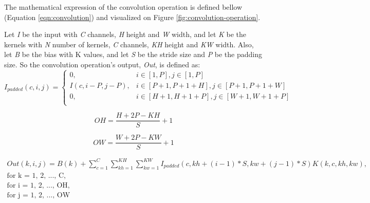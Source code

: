 The mathematical expression of the convolution operation is defined bellow (Equation \ref{eqn:convolution}) and visualized on Figure \ref{fig:convolution-operation}.

Let \emph{I} be the input with \emph{C} channels, \emph{H} height and \emph{W} width, and let \emph{K} be the kernels with \emph{N} number of kernels, \emph{C} channels, \emph{KH} height and \emph{KW} width. Also, let \emph{B} be the bias with K values, and let \emph{S} be the stride size and \emph{P} be the padding size. So the convolution operation's output, \emph{Out}, is defined as:
\begin{equation}
	I_{padded}(c, i, j) = \begin{cases}
		0,                  & i \in [1, P], j \in [1, P]                         \\
		I(c, i - P, j - P), & i \in [P + 1, P + 1 + H], j \in [P + 1, P + 1 + W] \\
		0,                  & i \in [H + 1, H + 1 + P], j \in [W + 1, W + 1 + P] \\
	\end{cases}
\end{equation}

\begin{equation}
	OH = \frac{H + 2P - KH}{S} + 1
\end{equation}

\begin{equation}
	OW = \frac{W + 2P - KW}{S} + 1
\end{equation}

\begin{equation}
	\label{eqn:convolution}
	\begin{split}
		Out(k, i, j) = B(k) +
		\sum_{c = 1}^{C} \sum_{kh = 1}^{KH} \sum_{kw = 1}^{KW}
		I_{padded}(c, kh + (i - 1) * S, kw + (j - 1) * S) K(k, c, kh, kw),\\
		\mbox{for k = 1, 2, ..., C},\\
		\mbox{for i = 1, 2, ..., OH},\\
		\mbox{for j = 1, 2, ..., OW}\\
	\end{split}
\end{equation}

